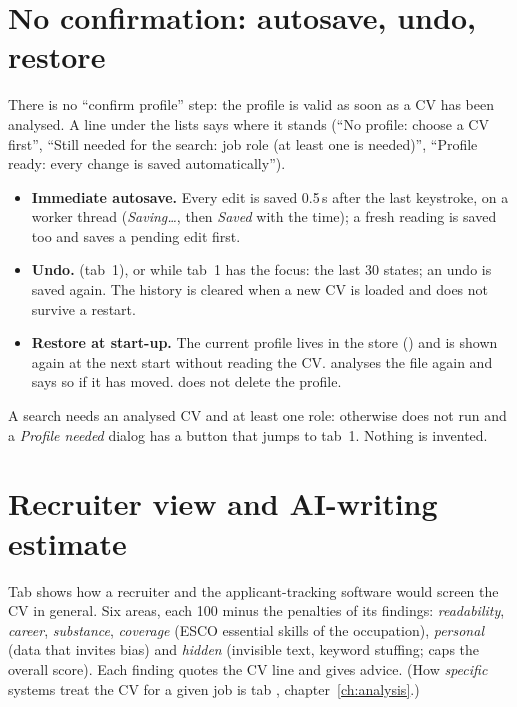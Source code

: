 \section{No confirmation: autosave, undo, restore}\label{sec:autosave}
There is no ``confirm profile'' step: the profile is valid as soon as a CV has been analysed. A line
under the lists says where it stands (``No profile: choose a CV first'', ``Still needed for the search:
job role (at least one is needed)'', ``Profile ready: every change is saved automatically'').
\begin{itemize}
  \item \textbf{Immediate autosave.} Every edit is saved 0.5\,s after the last keystroke, on a
        worker thread (\emph{Saving\ldots}, then \emph{Saved} with the time); a fresh reading is saved too and
         saves a pending edit first.
  \item \textbf{Undo.}  (tab~1),  or  while tab~1 has
        the focus: the last 30 states; an undo is saved again. The history is cleared when a new CV is
        loaded and does not survive a restart.
  \item \textbf{Restore at start-up.} The current profile lives in the store () and is shown
        again at the next start without reading the CV.  analyses the file again and says so if
        it has moved.  does not delete the profile.
\end{itemize}
A search needs an analysed CV and at least one role: otherwise  does not run and a
\emph{Profile needed} dialog has a button that jumps to tab~1. Nothing is invented.

\section{Recruiter view and AI-writing estimate}\label{sec:aiestimate}
Tab  shows how a recruiter and the applicant-tracking software would screen the CV in
general. Six areas, each 100 minus the penalties of its findings: \emph{readability}, \emph{career},
\emph{substance}, \emph{coverage} (ESCO essential skills of the occupation), \emph{personal} (data that
invites bias) and \emph{hidden} (invisible text, keyword stuffing; caps the overall score). Each finding
quotes the CV line and gives advice. (How \emph{specific} systems treat the CV for a given job is tab
, chapter~\ref{ch:analysis}.)

